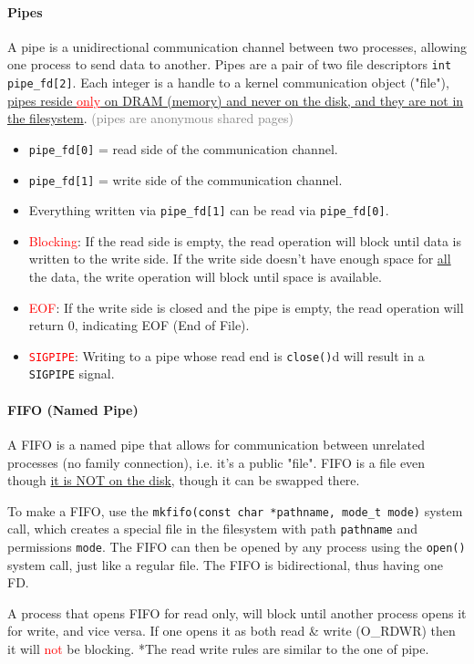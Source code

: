 \documentclass[openany,12pt]{book}
\newcommand{\code}[1]{\texttt{#1}}
\newcommand{\red}[1]{\textcolor{Red}{#1}}
\newcommand{\gray}[1]{\textcolor{gray}{#1}}
\begin{document}
\paragraph{Pipes} A pipe is a unidirectional communication channel between two processes, allowing one process to send data to another. Pipes are a pair of two file descriptors \code{int pipe\_fd[2]}. Each integer is a handle to a kernel communication object ("file"), \ul{pipes reside }\red{\ul{only}}\ul{ on DRAM (memory) and never on the disk, and they are not in the filesystem}. \gray{(pipes are anonymous shared pages)}
\begin{itemize}
  \item \code{pipe\_fd[0]} = read side of the communication channel.
  \item \code{pipe\_fd[1]} = write side of the communication channel.
  \item Everything written via \code{pipe\_fd[1]} can be read via \code{pipe\_fd[0]}.
  \item \red{Blocking}: If the read side is empty, the read operation will block until data is written to the write side. If the write side doesn't have enough space for \ul{all} the data, the write operation will block until space is available.
  \item \red{EOF}: If the write side is closed and the pipe is empty, the read operation will return 0, indicating EOF (End of File). 
  \item \red{\code{SIGPIPE}}: Writing to a pipe whose read end is \code{close()}d will result in a \code{SIGPIPE} signal.
\end{itemize}

\paragraph{FIFO (Named Pipe)} A FIFO is a named pipe that allows for communication between unrelated processes (no family connection), i.e. it's a public "file". FIFO is a file even though \ul{it is NOT on the disk}, though it can be swapped there. 

To make a FIFO, use the \code{mkfifo(const char *pathname, mode\_t mode)} system call, which creates a special file in the filesystem with path \code{pathname} and permissions \code{mode}. The FIFO can then be opened by any process using the \code{open()} system call, just like a regular file. The FIFO is bidirectional, thus having one FD. 

A process that opens FIFO for read only, will block until another process opens it for write, and vice versa. If one opens it as both read \& write (O\_RDWR) then it will \red{not} be blocking. *The read write rules are similar to the one of pipe.
\end{document}
